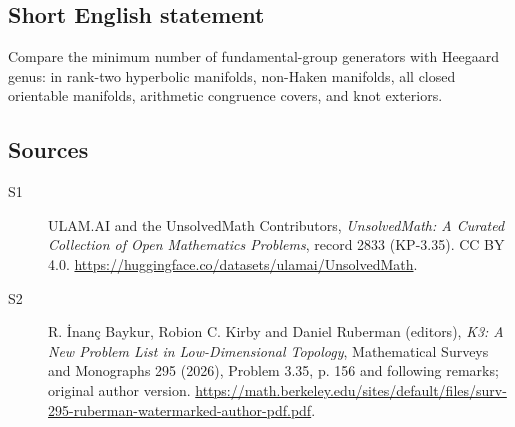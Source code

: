 \documentclass[11pt]{article}
\begin{document}
\subsection{Short English statement}
Compare the minimum number of fundamental-group generators with Heegaard genus: in rank-two hyperbolic manifolds, non-Haken manifolds, all closed orientable manifolds, arithmetic congruence covers, and knot exteriors.
\subsection{Sources}
\begin{description}
\item[\hypertarget{source:2833:1}{S1}] ULAM.AI and the UnsolvedMath Contributors, \emph{UnsolvedMath: A Curated Collection of Open Mathematics Problems}, record 2833 (KP-3.35). CC BY 4.0. \url{https://huggingface.co/datasets/ulamai/UnsolvedMath}.
\item[\hypertarget{source:2833:2}{S2}] R. İnanç Baykur, Robion C. Kirby and Daniel Ruberman (editors), \emph{K3: A New Problem List in Low-Dimensional Topology}, Mathematical Surveys and Monographs 295 (2026), Problem 3.35, p. 156 and following remarks; original author version. \url{https://math.berkeley.edu/sites/default/files/surv-295-ruberman-watermarked-author-pdf.pdf}.
\end{description}
\label{end:2833}
\end{document}
